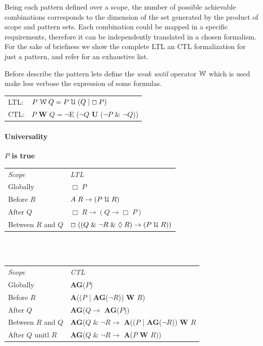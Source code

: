 Being each pattern defined over a scope, the number of possible achievable combinations corresponds to the dimension of the set generated by the product of scope and pattern sets. Each combination could be mapped in a specific requirements, therefore it can be independently translated in a chosen formalism. For the sake of briefness we show the complete LTL an CTL formalization for just a pattern, and refer \citep{specpatterns} for an exhaustive list. 
\par Before describe the pattern lets define the \textit{weak until} operator $\EuScript{W}$ which is used make less verbose the expression of some formulas.
\begin{center}
\begin{tabular}{ll}
LTL: &$P \;\EuScript{W}\; Q = P \;\EuScript{U} \; (Q\; |\; \Box\:P) $ \\
CTL: &$P$ \textbf{W} $Q = \neg$E ($\neg Q$ \textbf{U} ($\neg P$ $\&$ $\neg Q$))
\end{tabular}
\end{center}
\paragraph{Universality} \textbf{$P$ is true}\noindent\\
\begin{tabular}{ll}
\textit{Scope} & \textit{LTL} \\
Globally & $ \Box\;P$ \\ 
Before $R$ & $A\;R\rightarrow(P\;\EuScript{U}\;R)$\\
  After $Q$ & $ \Box\;R\rightarrow(Q\rightarrow \Box\; P)$	\\
Between $R$ and $Q$ & $ \Box\;((Q\; \&\; \neg R\; \&\; \lozenge\:R)\rightarrow(P\;\EuScript{U}\;R))$	\\
\end{tabular}
\\
\\
\begin{tabular}{ll}
\textit{Scope} & \textit{CTL} \\
Globally & \textbf{AG}($P$) \\ 
Before $R$ & \textbf{A}(($P$ | \textbf{AG}($\neg R$)) \textbf{W} $R$)\\
After $Q$ & \textbf{AG}($Q \rightarrow $ \textbf{AG}($P$))	\\
Between $R$ and $Q$ & \textbf{AG}($Q\;\&\;\neg R \rightarrow$ \textbf{A}(($P$ | \textbf{AG}($\neg R$)) \textbf{W} $R$	\\
After $Q$ unitl $R$ & \textbf{AG}($Q\;\&\;\neg R \rightarrow$ \textbf{A}($P$ \textbf{W} $R$))
\end{tabular}

